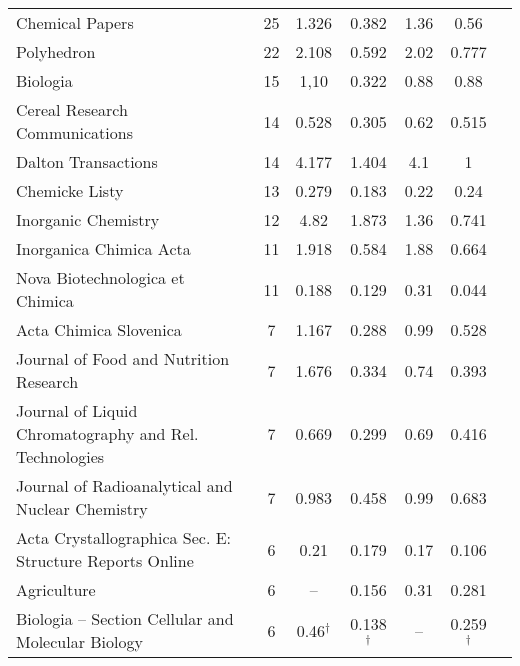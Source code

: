 {\begin{longtable}[c]{lcccccc}
  Chemical Papers                                         & 25 & 1.326         & 0.382          & 1.36 & 0.56          \\
  Polyhedron                                              & 22 & 2.108         & 0.592          & 2.02 & 0.777         \\
  Biologia                                                & 15 & 1,10          & 0.322          & 0.88 & 0.88          \\
  Cereal Research Communications                          & 14 & 0.528         & 0.305          & 0.62 & 0.515         \\
  Dalton Transactions                                     & 14 & 4.177         & 1.404          & 4.1  & 1             \\[1ex]
  Chemicke Listy                                          & 13 & 0.279         & 0.183          & 0.22 & 0.24          \\
  Inorganic Chemistry                                     & 12 & 4.82          & 1.873          & 1.36 & 0.741         \\
  Inorganica Chimica Acta                                 & 11 & 1.918         & 0.584          & 1.88 & 0.664         \\
  Nova Biotechnologica et Chimica                         & 11 & 0.188         & 0.129          & 0.31 & 0.044         \\
  Acta Chimica Slovenica                                  & 7  & 1.167         & 0.288          & 0.99 & 0.528         \\[1ex]
  Journal of Food and Nutrition Research                  & 7  & 1.676         & 0.334          & 0.74 & 0.393         \\
  Journal of Liquid Chromatography and Rel. Technologies  & 7  & 0.669         & 0.299          & 0.69 & 0.416         \\
  Journal of Radioanalytical and Nuclear Chemistry        & 7  & 0.983         & 0.458          & 0.99 & 0.683         \\
  Acta Crystallographica Sec. E: Structure Reports Online & 6  & 0.21          & 0.179          & 0.17 & 0.106         \\
  Agriculture                                             & 6  & --            & 0.156          & 0.31 & 0.281         \\[1ex]
  Biologia -- Section Cellular and Molecular Biology      & 6  & 0.46$^\dagger$ & 0.138 $^\dagger$ &  --  & 0.259$^\dagger$ \\

\end{longtable}}
